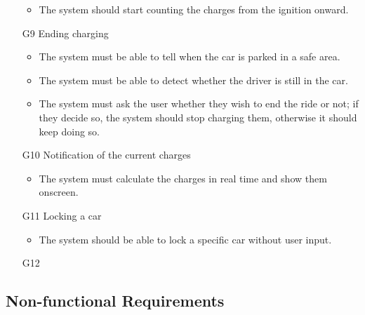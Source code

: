 \begin{itemize}
\begin{itemize}
			\item The system should start counting the charges from the ignition onward. %
		\end{itemize}
	\item [G9] Ending charging %
		\begin{itemize}
			\item The system must be able to tell when the car is parked in a safe area.
			\item The system must be able to detect whether the driver is still in the car.
			\item The system must ask the user whether they wish to end the ride or not; if they decide so, the system should stop charging them, otherwise it should keep doing so. 
		\end{itemize}
	\item [G10] Notification of the current charges %
		\begin{itemize}
			\item The system must calculate the charges in real time and show them onscreen. %
		\end{itemize}
	\item [G11] Locking a car %
		\begin{itemize}
			\item The system should be able to lock a specific car without user input. %
		\end{itemize}
	\item [G12] 
\end{itemize}



\subsection{Non-functional Requirements}